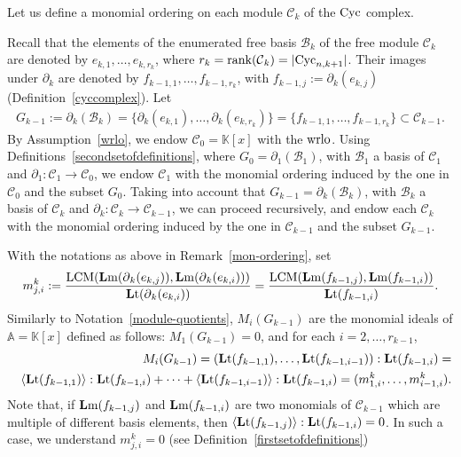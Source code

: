 \documentclass[ALCO]{cedram}
\newcommand{\mbk}{\mbox{$\mathbb{K}$}}
\newcommand{\mba}{\mbox{$\mathbb{A}$}}
\newcommand{\lm}{\mbox{${\bf L}{\rm m}$}}
\newcommand{\lt}{\mbox{${\bf L}{\rm t}$}}
\newcommand{\mcb}{\mbox{$\mathcal{B}$}}
\newcommand{\mcc}{\mbox{$\mathcal{C}$}}
\newcommand{\dif}{\mbox{$\partial$}}
\newcommand{\Lcm}{\mbox{${\rm LCM}$}}
\newcommand{\rank}{\mbox{${\rm rank}$}}
\newcommand{\cyc}{\mbox{${\rm Cyc}$}}
\newcommand{\wrlo}{\mbox{${\rm wrlo}$}}
\begin{document}
Let us define a monomial ordering on each module $\mcc_{k}$ of the
$\cyc$ complex.

\begin{remark}\label{mon-ordering}
Recall that the elements of the enumerated free basis $\mcb_k$ of the
free module $\mcc_k$ are denoted by $e_{k,1},\ldots ,e_{k,r_k}$, where
$r_k=\rank(\mcc_k)=\lvert\cyc_{n,k+1}\rvert$. Their images under
$\dif_k$ are denoted by $f_{k-1,1},\ldots ,f_{k-1,r_k}$, with
$f_{k-1,j}:=\dif_k(e_{k,j})$ (Definition~\ref{cyccomplex}). Let
\begin{eqnarray*}
G_{k-1}:=\dif_k(\mcb_k)= \{\dif_{k}(e_{k,1}),\ldots
,\dif_{k}(e_{k,r_k})\}= \{f_{k-1,1},\ldots
,f_{k-1,r_k}\}\subset\mcc_{k-1}.
\end{eqnarray*}
By Assumption~\ref{wrlo}, we endow $\mcc_0=\mbk[x]$ with the
$\wrlo$. Using Definitions~\ref{secondsetofdefinitions}, where
$G_0=\dif_1(\mcb_1)$, with $\mcb_1$ a basis of $\mcc_1$ and
$\dif_1:\mcc_1\to\mcc_0$, we endow $\mcc_1$ with the monomial ordering
induced by the one in $\mcc_0$ and the subset $G_0$. Taking into
account that $G_{k-1}=\dif_k(\mcb_{k})$, with $\mcb_{k}$ a basis of
$\mcc_k$ and $\dif_k:\mcc_k\to\mcc_{k-1}$, we can proceed recursively,
and endow each $\mcc_k$ with the monomial ordering induced by the one
in $\mcc_{k-1}$ and the subset $G_{k-1}$.
\end{remark}

\begin{notation}\label{m-basis-elements}
With the notations as above in Remark~\ref{mon-ordering}, set
\begin{eqnarray*}
m^k_{j,i}:=\frac{\Lcm(\lm(\dif_{k}(e_{k,j})),\lm(\dif_k(e_{k,i})))}
{\lt(\dif_k(e_{k,i}))}=
\frac{\Lcm(\lm(f_{k-1,j}),\lm(f_{k-1,i}))}{\lt(f_{k-1,i})}.
\end{eqnarray*}
Similarly to Notation~\ref{module-quotients}, $M_i(G_{k-1})$ are the
monomial ideals of $\mba=\mbk[x]$ defined as follows:
$M_1(G_{k-1})=0$, and for each $i=2,\ldots,r_{k-1}$,
\begin{eqnarray*}
&& M_i(G_{k-1})=(\lt(f_{k-1,1}),\ldots,\lt(f_{k-1,i-1})):\lt(f_{k-1,i})=
  \\ && \langle\lt(f_{k-1,1})\rangle:\lt(f_{k-1,i})+\cdots+
  \langle\lt(f_{k-1,i-1})\rangle:\lt(f_{k-1,i})= (m^k_{1,i},\ldots
  ,m^k_{i-1,i}).
\end{eqnarray*}
Note that, if $\lm(f_{k-1,j})$ and $\lm(f_{k-1,i})$ are two monomials
of $\mcc_{k-1}$ which are multiple of different basis elements, then
$\langle\lt(f_{k-1,j})\rangle:\lt(f_{k-1,i})=0$. In such a case, we
understand $m_{j,i}^k=0$ (see Definition~\ref{firstsetofdefinitions})
\end{notation}
 
\end{document}
